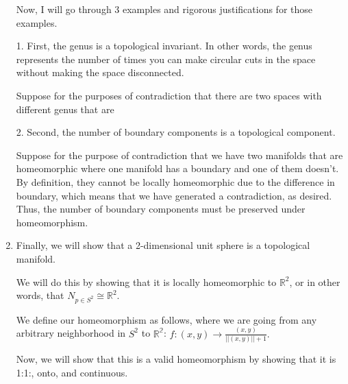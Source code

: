 \documentclass[12pt]{article}
\begin{document}
\begin{enumerate}
Now, I will go through 3 examples and rigorous justifications for those examples.

1. First, the genus is a topological invariant. In other words, the genus represents the number of times you can make circular cuts in the space without making the space disconnected.

Suppose for the purposes of contradiction that there are two spaces with different genus that are 

2. Second, the number of boundary components is a topological component.

Suppose for the purpose of contradiction that we have two manifolds that are homeomorphic where one manifold has a boundary and one of them doesn't. By definition, they cannot be locally homeomorphic due to the difference in boundary, which means that we have generated a contradiction, as desired. Thus, the number of boundary components must be preserved under homeomorphism.  

\newpage
\item Finally, we will show that a 2-dimensional unit sphere is a topological manifold.

We will do this by showing that it is locally homeomorphic to $\mathbb{R}^2$, or in other words, that $N_{p\in S^2} \cong \mathbb{R}^2$.

We define our homeomorphism as follows, where we are going from any arbitrary neighborhood in $S^2$ to $\mathbb{R^2}$: $f: (x,y) \to \frac{(x, y)}{||(x,y)|| + 1}.$

Now, we will show that this is a valid homeomorphism by showing that it is 1:1:, onto, and continuous.




\end{enumerate}
\end{document}
